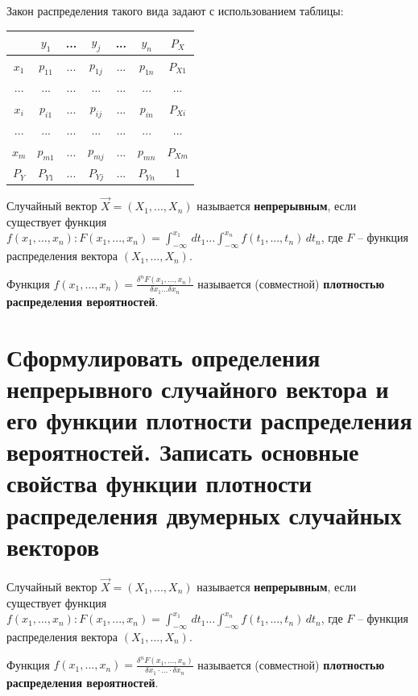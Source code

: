 Закон распределения такого вида задают с использованием таблицы:

\begin{tabular}{|c|c|c|c|c|c|c|}
	\hline
	  & $y_1$ & ... & $y_j$ & ... & $y_n$ & $P_X$ \\ \hline
	$x_1$ & $p_{11}$ & ... & $p_{1j}$ & ... & $p_{1n}$ & $P_{X1}$ \\ \hline
	... & ... & ... & ... & ... & ... & ... \\ \hline
	$x_i$ & $p_{i1}$ & ... & $p_{ij}$ & ... & $p_{in}$ & $P_{Xi}$ \\ \hline
	... & ... & ... & ... & ... & ... & ... \\ \hline
	$x_m$ & $p_{m1}$ & ... & $p_{mj}$ & ... & $p_{mn}$ & $P_{Xm}$ \\ \hline
	$P_Y$ & $P_{Y1}$ & ... & $P_{Yj}$ & ... & $P_{Yn}$ & 1 \\ \hline
\end{tabular}

Случайный вектор $\vec{X} = (X_1, ..., X_n)$ называется \textbf{непрерывным}, если существует функция $f(x_1, ..., x_n): F(x_1, ..., x_n) = \int_{-\infty}^{x_1} \, dt_1 ... \int_{-\infty}^{x_n} f(t_1, ..., t_n) \, dt_n$, где $F$ -- функция распределения вектора $(X_1, ..., X_n)$.

Функция $f(x_1, ..., x_n) = \frac {\delta^n F(x_1, ..., x_n)}{\delta x_1 ... \delta x_n}$ называется (совместной) \textbf{плотностью распределения вероятностей}.

\section{Сформулировать определения непрерывного случайного вектора и его функции плотности распределения вероятностей. Записать основные свойства функции плотности распределения двумерных случайных векторов}

Случайный вектор $\vec{X} = (X_1, ..., X_n)$ называется \textbf{непрерывным}, если существует функция $f(x_1, ..., x_n): F(x_1, ..., x_n) = \int_{-\infty}^{x_1} \, dt_1 ... \int_{-\infty}^{x_n} f(t_1, ..., t_n) \, dt_n$, где $F$ -- функция распределения вектора $(X_1, ..., X_n)$.

Функция $f(x_1, ..., x_n) = \frac {\delta^n F(x_1, ..., x_n)}{\delta x_1 \cdot ... \cdot \delta x_n}$ называется (совместной) \textbf{плотностью распределения вероятностей}.

